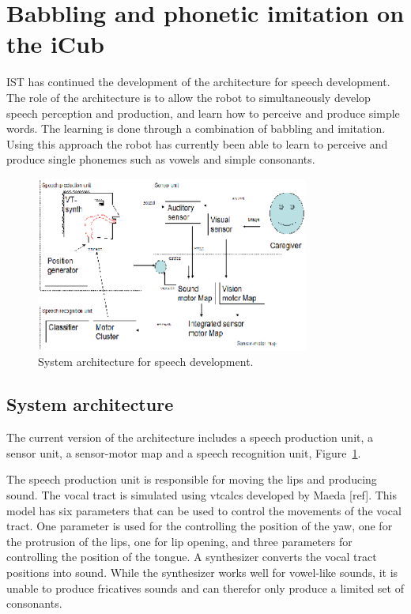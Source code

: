 \section{Babbling and phonetic imitation on the iCub}

\label{sect:babbling}

IST has continued the development of the architecture for speech
development. The role of the architecture is to allow the robot to
simultaneously develop speech perception and production, and learn how
to perceive and produce simple words. The learning is done through a
combination of babbling and imitation. Using this approach the robot
has currently been able to learn to perceive and produce single
phonemes such as vowels and simple consonants. 
\begin{figure}
\centering
\includegraphics[width=0.8\textwidth]{include/babbling/images/arch.eps}
\caption{System architecture for speech development.}
\label{fig:babbling:arch}
\end{figure}

\subsection{System architecture}
The current version of the architecture includes a speech production
unit, a sensor unit, a sensor-motor map and a speech recognition unit,
Figure~\ref{fig:babbling:arch}.

The speech production unit is responsible for moving the lips and
producing sound. The vocal tract is simulated using vtcalcs developed
by Maeda [ref]. This model has six parameters that can be used to
control the movements of the vocal tract. One parameter is used for
the controlling the position of the yaw, one for the protrusion of the
lips, one for lip opening, and three parameters for controlling the
position of the tongue. A synthesizer converts the vocal tract
positions into sound. While the synthesizer works well for vowel-like
sounds, it is unable to produce fricatives sounds and can therefor
only produce a limited set of consonants.

